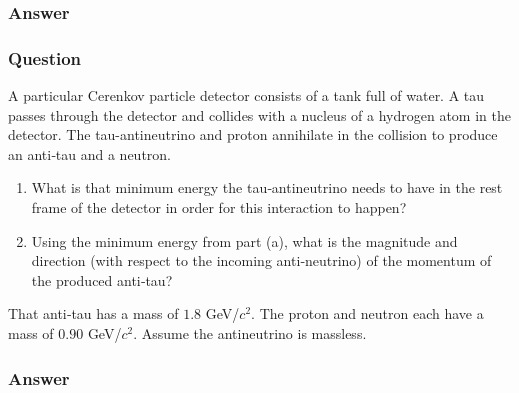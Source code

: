 \subsubsection{Answer}


\subsubsection{Question}
A particular Cerenkov particle detector consists of a tank full of water. A tau passes through the detector and collides with a nucleus of a hydrogen atom in the detector. The tau-antineutrino and proton annihilate in the collision to produce an anti‐tau and a neutron.
\begin{enumerate}
	\item What is that minimum energy the tau‐antineutrino needs to have in the rest frame of the detector in order for this interaction to happen?
	\item Using the minimum energy from part (a), what is the magnitude and direction (with respect to the incoming anti‐neutrino) of the momentum of the produced anti‐tau?
\end{enumerate}
That anti‐tau has a mass of $1.8$ GeV/$c^2$. The proton and neutron each have a mass of $0.90$ GeV/$c^2$. Assume the antineutrino is massless.
\subsubsection{Answer}

